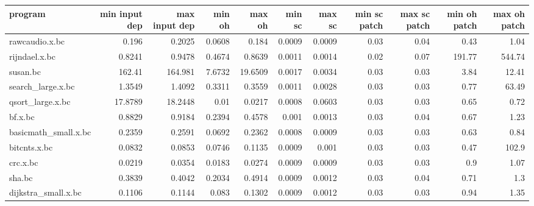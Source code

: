 \begin{tabular}{lrrrrrrrrrr}
\hline
 program              &   min input dep &   max input dep &   min oh &   max oh &   min sc &   max sc &   min sc patch &   max sc patch &   min oh patch &   max oh patch \\
\hline
 rawcaudio.x.bc       &          0.196  &          0.2025 &   0.0608 &   0.184  &   0.0009 &   0.0009 &           0.03 &           0.04 &           0.43 &           1.04 \\
 rijndael.x.bc        &          0.8241 &          0.9478 &   0.4674 &   0.8639 &   0.0011 &   0.0014 &           0.02 &           0.07 &         191.77 &         544.74 \\
 susan.bc             &        162.41   &        164.981  &   7.6732 &  19.6509 &   0.0017 &   0.0034 &           0.03 &           0.03 &           3.84 &          12.41 \\
 search\_large.x.bc    &          1.3549 &          1.4092 &   0.3311 &   0.3559 &   0.0011 &   0.0028 &           0.03 &           0.03 &           0.77 &          63.49 \\
 qsort\_large.x.bc     &         17.8789 &         18.2448 &   0.01   &   0.0217 &   0.0008 &   0.0603 &           0.03 &           0.03 &           0.65 &           0.72 \\
 bf.x.bc              &          0.8829 &          0.9184 &   0.2394 &   0.4578 &   0.001  &   0.0013 &           0.03 &           0.04 &           0.67 &           1.23 \\
 basicmath\_small.x.bc &          0.2359 &          0.2591 &   0.0692 &   0.2362 &   0.0008 &   0.0009 &           0.03 &           0.03 &           0.63 &           0.84 \\
 bitcnts.x.bc         &          0.0832 &          0.0853 &   0.0746 &   0.1135 &   0.0009 &   0.001  &           0.03 &           0.03 &           0.47 &         102.9  \\
 crc.x.bc             &          0.0219 &          0.0354 &   0.0183 &   0.0274 &   0.0009 &   0.0009 &           0.03 &           0.03 &           0.9  &           1.07 \\
 sha.bc               &          0.3839 &          0.4042 &   0.2034 &   0.4914 &   0.0009 &   0.0012 &           0.03 &           0.04 &           0.71 &           1.3  \\
 dijkstra\_small.x.bc  &          0.1106 &          0.1144 &   0.083  &   0.1302 &   0.0009 &   0.0012 &           0.03 &           0.03 &           0.94 &           1.35 \\

\end{tabular}
